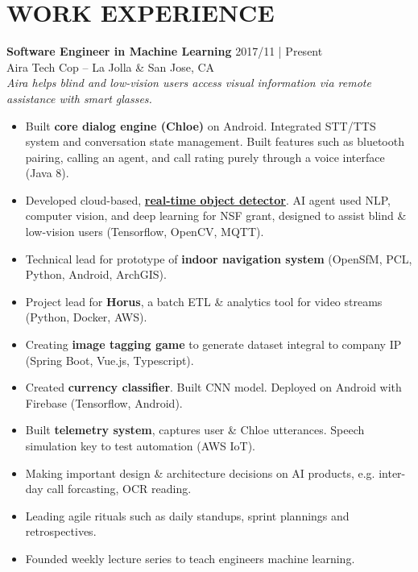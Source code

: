 \documentclass[line,mm]{res}
\begin{document}
\section{WORK EXPERIENCE} 
{\bf Software Engineer in Machine Learning } \hfill 2017/11 | Present \\
  Aira Tech Cop -- La Jolla \& San Jose, CA \\
  \textit{ Aira helps blind and low-vision users access visual information via remote assistance with smart glasses. }
  \begin{itemize}  \itemsep -2pt %
    \item Built {\bf core dialog engine (Chloe)} on Android. Integrated STT/TTS system and conversation state management. Built features such as bluetooth pairing, calling an agent, and call rating purely through a voice interface (Java 8). 
    \item Developed cloud-based, \href{https://github.com/aira/object_detector}{{\bf real-time object detector}}.  AI agent used NLP, computer vision, and deep learning for NSF grant, designed to assist blind \& low-vision users (Tensorflow, OpenCV, MQTT).
    \item Technical lead for prototype of {\bf indoor navigation system} (OpenSfM, PCL, Python, Android, ArchGIS). 
    \item Project lead for {\bf Horus}, a batch ETL \& analytics tool for video streams (Python, Docker, AWS).
    \item Creating {\bf image tagging game} to generate dataset integral to company IP (Spring Boot, Vue.js, Typescript).
    \item Created {\bf currency classifier}. Built CNN model. Deployed on Android with Firebase (Tensorflow, Android).
    \item Built {\bf telemetry system}, captures user \& Chloe utterances. Speech simulation key to test automation (AWS IoT).
    \item Making important design \& architecture decisions on AI products, e.g. inter-day call forcasting, OCR reading.
    \item Leading agile rituals such as daily standups, sprint plannings and retrospectives.
    \item Founded weekly lecture series to teach engineers machine learning. 
  \end{itemize} 
\end{document}

